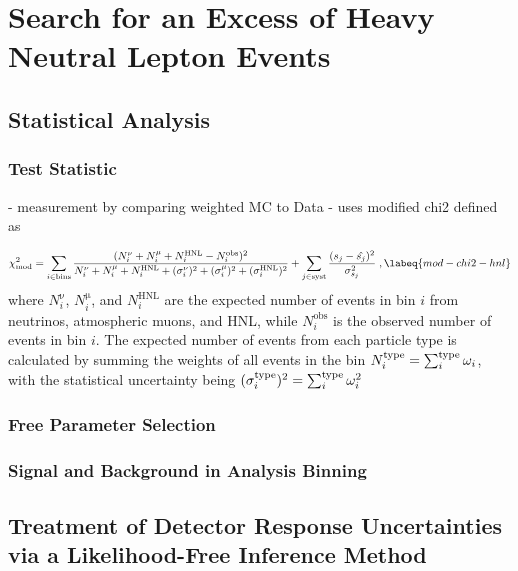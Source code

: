 \setchapterpreamble[u]{\margintoc}

\chapter{Search for an Excess of Heavy Neutral Lepton Events}


\section{Statistical Analysis} 

\subsection{Test Statistic}

- measurement by comparing weighted MC to Data
- uses modified chi2 defined as


\begin{equation}
    \chi^2_{\mathrm{mod}} = 
    \sum_{i \in \mathrm{bins}}^{}\frac{(N^{\mathrm{\nu}}_i + N^{\mathrm{\mu}}_i + N^{\mathrm{HNL}}_i - N^{\mathrm{obs}}_i)^2}
    {N^{\mathrm{\nu}}_i + N^{\mathrm{\mu}}_i + N^{\mathrm{HNL}}_i + (\sigma^{\mathrm{\nu}}_i)^2 + (\sigma^{\mathrm{\mu}}_i)^2 + (\sigma^{\mathrm{HNL}}_i)^2}
     + \sum_{j \in \mathrm{syst}}^{}\frac{(s_j - \hat{s_j})^2}{\sigma^2_{s_j}}
    \;,
    \labeq{mod-chi2-hnl}
\end{equation}
where $N^{\mathrm{\nu}}_i$, $N^{\mathrm{\mu}}_i$, and $N^{\mathrm{HNL}}_i$ are the expected number of events in bin $i$ from neutrinos, atmospheric muons, and HNL, while $N^{\mathrm{obs}}_i$ is the observed number of events in bin $i$. The expected number of events from each particle type is calculated by summing the weights of all events in the bin $N^{\mathrm{type}}_i = \sum_i^{\rm type}\omega_i$, with the statistical uncertainty being $(\sigma^{\mathrm{type}}_i)^2 = \sum_i^{\rm type}\omega_i^2$ 


\subsection{Free Parameter Selection}

\subsection{Signal and Background in Analysis Binning}


\section{Treatment of Detector Response Uncertainties via a Likelihood-Free Inference Method}


